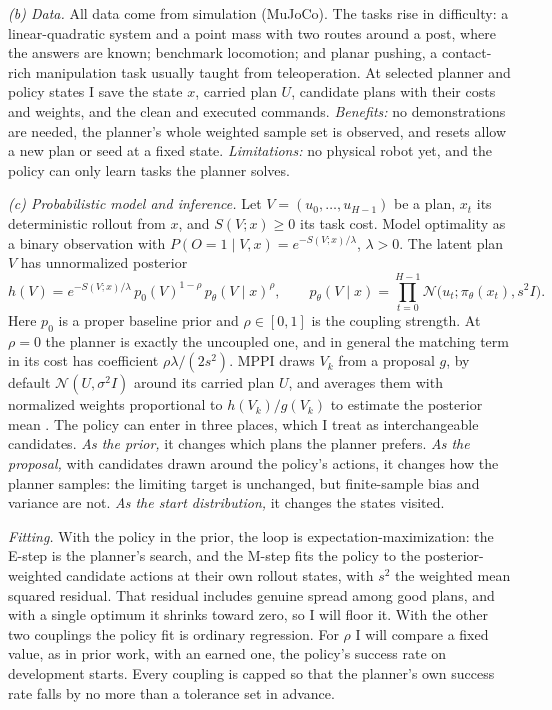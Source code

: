 \documentclass[12pt]{article}
\begin{document}
\textit{(b) Data.}
All data come from simulation (MuJoCo). The tasks rise in difficulty: a
linear-quadratic system and a point mass with two routes around a post, where the
answers are known; benchmark locomotion; and planar pushing, a contact-rich
manipulation task usually taught from teleoperation. At selected planner and policy
states I save the state $x$, carried plan $U$, candidate plans with their costs and
weights, and the clean and executed commands.
\emph{Benefits:} no demonstrations are needed, the planner's whole weighted sample
set is observed, and resets allow a new plan or seed at a fixed state.
\emph{Limitations:} no physical robot yet, and the policy can only learn tasks the
planner solves.

\textit{(c) Probabilistic model and inference.}
Let $V=(u_0,\ldots,u_{H-1})$ be a plan, $x_t$ its deterministic rollout from $x$,
and $S(V;x)\geq0$ its task cost. Model optimality as a binary observation
with $P(O=1\mid V,x)=e^{-S(V;x)/\lambda}$, $\lambda>0$. The latent plan $V$ has
unnormalized posterior
\[
 h(V)=e^{-S(V;x)/\lambda}\,p_0(V)^{1-\rho}\,p_\theta(V\mid x)^{\rho},\qquad
 p_\theta(V\mid x)=\prod_{t=0}^{H-1}\mathcal N\bigl(u_t;\pi_\theta(x_t),s^2I\bigr).
\]
Here $p_0$ is a proper baseline prior and $\rho\in[0,1]$ is the coupling strength.
At $\rho=0$ the planner is exactly the uncoupled one, and in general the matching
term in its cost has coefficient $\rho\lambda/(2s^2)$. MPPI draws $V_k$ from a
proposal $g$, by default $\mathcal N(U,\sigma^2I)$ around its carried plan $U$, and
averages them with normalized weights proportional to $h(V_k)/g(V_k)$ to estimate
the posterior mean \citep{williams2017}. The policy can enter in three places, which
I treat as interchangeable candidates. \emph{As the prior,} it changes which plans
the planner prefers. \emph{As the proposal,} with candidates drawn around the
policy's actions, it changes how the planner samples: the limiting target is
unchanged, but finite-sample bias and variance are not. \emph{As the start
distribution,} it changes the states visited.

\emph{Fitting.} With the policy in the prior, the loop is expectation-maximization:
the E-step is the planner's search, and the M-step fits the policy to the
posterior-weighted candidate actions at their own rollout states, with $s^2$ the
weighted mean squared residual. That residual includes genuine spread among good
plans, and with a single optimum it shrinks toward zero, so I will floor it. With
the other two couplings the policy fit is ordinary regression. For $\rho$ I will
compare a fixed value, as in prior work, with an earned one, the policy's success
rate on development starts. Every coupling is capped so that the planner's own
success rate falls by no more than a tolerance set in advance.
\end{document}

